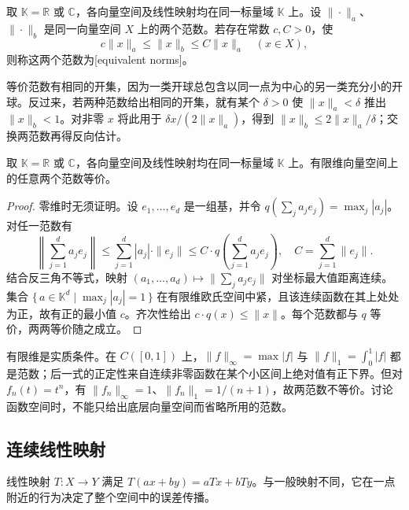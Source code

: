 \begin{definition}\label{b1:def:equivalent-norms}
取 \(\mathbb K=\mathbb R\) 或 \(\mathbb C\)，各向量空间及线性映射均在同一标量域 \(\mathbb K\) 上。设 \(\|\cdot\|_a\)、\(\|\cdot\|_b\) 是同一向量空间 \(X\) 上的两个范数。若存在常数 \(c,C>0\)，使
\[
c\|x\|_a\leq\|x\|_b\leq C\|x\|_a
\quad(x\in X),
\]
则称这两个范数为[equivalent norms]。
\end{definition}

等价范数有相同的开集，因为一类开球总包含以同一点为中心的另一类充分小的开球。反过来，若两种范数给出相同的开集，就有某个 \(\delta>0\) 使 \(\|x\|_a<\delta\) 推出 \(\|x\|_b<1\)。对非零 \(x\) 将此用于 \(\delta x/(2\|x\|_a)\)，得到 \(\|x\|_b\leq2\|x\|_a/\delta\)；交换两范数再得反向估计。

\begin{proposition}\label{b1:prop:finite-dimensional-norms}
取 \(\mathbb K=\mathbb R\) 或 \(\mathbb C\)，各向量空间及线性映射均在同一标量域 \(\mathbb K\) 上。有限维向量空间上的任意两个范数等价。
\end{proposition}
\begin{proof}
零维时无须证明。设 \(e_1,\ldots,e_d\) 是一组基，并令
\(q(\sum_ja_je_j)=\max_j|a_j|\)。对任一范数有
\[
\left\|\sum_{j=1}^da_je_j\right\|
\leq\sum_{j=1}^d|a_j|\cdot\|e_j\|
\leq C\cdot q\left(\sum_{j=1}^da_je_j\right),
\quad C=\sum_{j=1}^d\|e_j\|.
\]
结合反三角不等式，映射 \((a_1,\ldots,a_d)\mapsto\|\sum_ja_je_j\|\) 对坐标最大值距离连续。集合 \(\{\,a\in\mathbb K^d\mid\max_j|a_j|=1\,\}\) 在有限维欧氏空间中紧，且该连续函数在其上处处为正，故有正的最小值 \(c\)。齐次性给出 \(c\cdot q(x)\leq\|x\|\)。每个范数都与 \(q\) 等价，两两等价随之成立。
\end{proof}

有限维是实质条件。在 \(C([0,1])\) 上，\(\|f\|_\infty=\max|f|\) 与 \(\|f\|_1=\int_0^1|f|\) 都是范数；后一式的正定性来自连续非零函数在某个小区间上绝对值有正下界。但对 \(f_n(t)=t^n\)，有 \(\|f_n\|_\infty=1\)、\(\|f_n\|_1=1/(n+1)\)，故两范数不等价。讨论函数空间时，不能只给出底层向量空间而省略所用的范数。

\subsection{连续线性映射}
\label{b1:subsec:080102}

线性映射 \(T:X\rightarrow Y\) 满足 \(T(ax+by)=aTx+bTy\)。与一般映射不同，它在一点附近的行为决定了整个空间中的误差传播。

